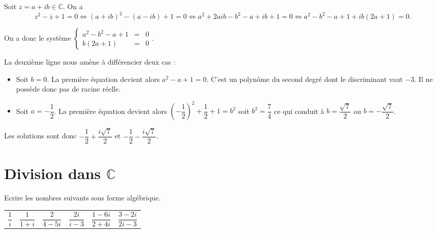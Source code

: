 \documentclass[11pt,fleqn, openany]{book} %
\begin{document}
\begin{solution}Soit \(z=a+ib\in\mathbb{C}\). On a 
 \[z^2-\overline{z}+1=0 \Leftrightarrow (a+ib)^2-(a-ib)+1=0 \Leftrightarrow a^2 +2aib -b^2-a+ib+1=0 \Leftrightarrow a^2-b^2-a+1+ib(2a+1)=0.\]

On a donc le système \(\left\{\begin{array}{rcl}a^2-b^2-a+1&=&0 \\ b(2a+1) &=&0\end{array}\right.\).

La deuxième ligne nous amène à différencier deux cas :
\begin{itemize}
\item Soit \(b=0\). La première équation devient alors \(a^2-a+1=0\). C'est un polynôme du second degré dont le discriminant vaut \(-3\). Il ne possède donc pas de racine réelle.
\item Soit \(a=-\dfrac{1}{2}\). La première équation devient alors \( \left(-\dfrac{1}{2}\right)^2+\dfrac{1}{2}+1=b^2\) soit \(b^2=\dfrac{7}{4}\) ce qui conduit à \(b=\dfrac{\sqrt{7}}{2}\) ou \(b=-\dfrac{\sqrt{7}}{2}\).\end{itemize}

Les solutions sont donc \(-\dfrac{1}{2}+\dfrac{i\sqrt{7}}{2}\) et \(-\dfrac{1}{2}-\dfrac{i\sqrt{7}}{2}\). \end{solution}



\section*{Division dans $\mathbb{C}$}

\begin{exercise}[topic=cpx03]Ecrire les nombres suivants sous forme algébrique.

\begin{tabularx}{\linewidth}{XXXXXX}
$\dfrac{1}{i}$ & $\dfrac{1}{1+i}$ & $\dfrac{2}{4-5i}$ & $\dfrac{2i}{i-3}$ & $\dfrac{1-6i}{2+4i}$ & $\dfrac{3-2i}{2i-3}$
\end{tabularx}\end{exercise}
\end{document}

